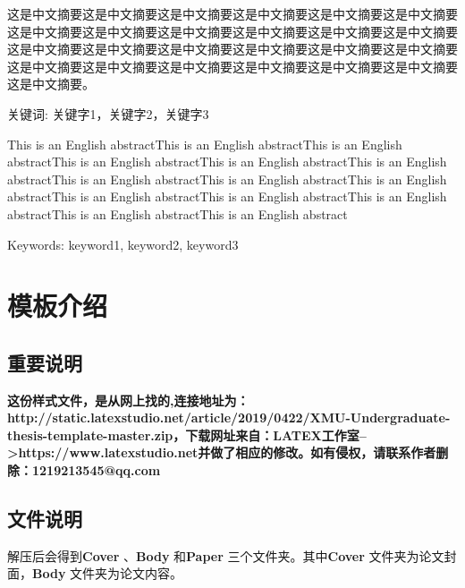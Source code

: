 \documentclass{imutthesis}
\begin{document}

\tableofcontents    %

\newpage 
{}
\begin{cnabstract}
这是中文摘要这是中文摘要这是中文摘要这是中文摘要这是中文摘要这是中文摘要这是中文摘要这是中文摘要这是中文摘要这是中文摘要这是中文摘要这是中文摘要这是中文摘要这是中文摘要这是中文摘要这是中文摘要这是中文摘要这是中文摘要这是中文摘要这是中文摘要这是中文摘要这是中文摘要这是中文摘要这是中文摘要这是中文摘要。

\par 关键词: 关键字1，关键字2，关键字3    %

\end{cnabstract}

\begin{enabstract}
    This is an English abstractThis is an English abstractThis is an English abstractThis is an English abstractThis is an English abstractThis is an English abstractThis is an English abstractThis is an English abstractThis is an English abstractThis is an English abstractThis is an English abstractThis is an English abstractThis is an English abstractThis is an English abstract

	\par Keywords: keyword1, keyword2, keyword3   %

\end{enabstract}

\newpage 
{}
\setcounter{page}{1}

\section{模板介绍}
\subsection{重要说明}
\textbf{这份样式文件，是从网上找的,连接地址为：http://static.latexstudio.net/article/2019/0422/XMU-Undergraduate-thesis-template-master.zip，下载网址来自：LATEX工作室-->https://www.latexstudio.net并做了相应的修改。如有侵权，请联系作者删除：1219213545@qq.com}
\subsection{文件说明}
解压后会得到\textbf{Cover} 、\textbf{Body} 和\textbf{Paper} 三个文件夹。其中\textbf{Cover} 文件夹为论文封面，\textbf{Body} 文件夹为论文内容。 
\end{document}
